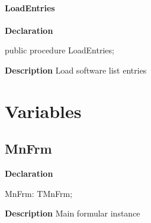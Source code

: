 \documentclass{report}
\newif\ifpdf
\begin{document}
\paragraph*{LoadEntries}\hspace*{\fill}

\label{manager.TMnFrm-LoadEntries}
\begin{list}{}{
\setlength{\itemindent}{0cm}
\setlength{\listparindent}{0cm}
\setlength{\leftmargin}{\evensidemargin}
\addtolength{\leftmargin}{\tmplength}
\settowidth{\labelsep}{X}
\addtolength{\leftmargin}{\labelsep}
\setlength{\labelwidth}{\tmplength}
}
\item[\textbf{Declaration}\hfill]
\ifpdf
\begin{flushleft}
\fi
\begin{ttfamily}
public procedure LoadEntries;\end{ttfamily}

\ifpdf
\end{flushleft}
\fi

\par
\item[\textbf{Description}]
Load software list entries

\end{list}
\section{Variables}
\ifpdf
\subsection*{\large{\textbf{MnFrm}}\normalsize\hspace{1ex}\hrulefill}
\else
\subsection*{MnFrm}
\fi
\label{manager-MnFrm}
\begin{list}{}{
\setlength{\itemindent}{0cm}
\setlength{\listparindent}{0cm}
\setlength{\leftmargin}{\evensidemargin}
\addtolength{\leftmargin}{\tmplength}
\settowidth{\labelsep}{X}
\addtolength{\leftmargin}{\labelsep}
\setlength{\labelwidth}{\tmplength}
}
\item[\textbf{Declaration}\hfill]
\ifpdf
\begin{flushleft}
\fi
\begin{ttfamily}
MnFrm:   TMnFrm;\end{ttfamily}

\ifpdf
\end{flushleft}
\fi

\par
\item[\textbf{Description}]
Main formular instance

\end{list}
\ifpdf
\end{document}
